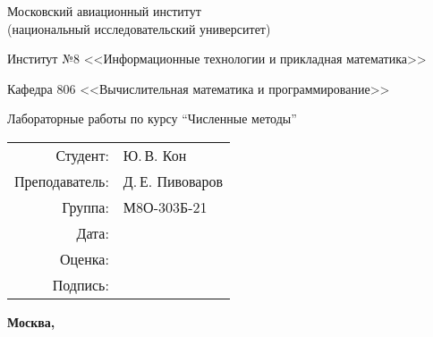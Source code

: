 \begin{titlepage}
    \begin{center}
    \bfseries
    
    {\Large Московский авиационный институт\\ (национальный исследовательский университет)
    
    }
    
    \vspace{48pt}
    
    {\large Институт №8 <<Информационные технологии и прикладная математика>>
    }
    
    \vspace{36pt}
    
    {\large Кафедра 806 <<Вычислительная математика и программирование>>
    
    }
    
    
    \vspace{48pt}
    
    Лабораторные работы по курсу \enquote{Численные методы}
    
    \end{center}
    
    \vspace{72pt}
    
    \begin{flushright}
    \begin{tabular}{rl}
    Студент: & Ю.\,В. Кон \\
    Преподаватель: & Д.\,Е. Пивоваров \\
    Группа: & М8О-303Б-21 \\
    Дата: & \\
    Оценка: & \\
    Подпись: & \\
    \end{tabular}
    \end{flushright}
    
    \vfill
    
    \begin{center}
    \bfseries
    Москва, \the\year
    \end{center}
    \end{titlepage}
    
    \pagebreak